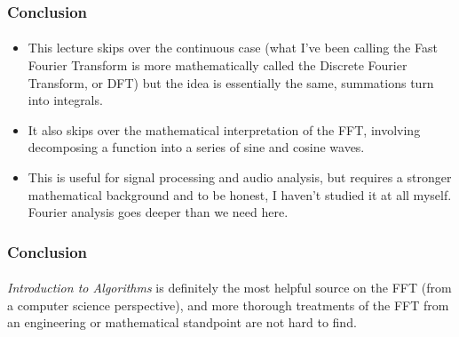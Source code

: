 \documentclass{beamer}                             %
\begin{document}
\begin{frame}
\frametitle{Conclusion}
\framesubtitle{}
\begin{itemize}
  \item This lecture skips over the continuous case (what I've been
    calling the Fast Fourier Transform is more mathematically called
    the \alert{Discrete Fourier Transform}, or DFT) but the idea is
    essentially the same, summations turn into integrals. \pause
  \item It also skips over the mathematical interpretation of the FFT,
    involving decomposing a function into a series of sine and cosine waves.
  \item This is useful for signal processing and audio analysis, but
    requires a stronger mathematical background and to be honest, I haven't
    studied it at all myself. Fourier analysis goes deeper than we need here.
\end{itemize}
\end{frame}

\begin{frame}
\frametitle{Conclusion}
\framesubtitle{}
\textit{Introduction to Algorithms} is definitely the most helpful source on
the FFT (from a computer science perspective), and more thorough treatments of
the FFT from an engineering or mathematical standpoint are not hard to find.
\end{frame}
\end{document}
